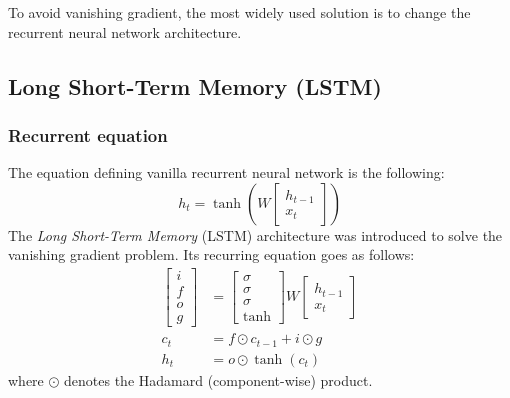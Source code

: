 To avoid vanishing gradient, the most widely used solution is to change the recurrent neural network architecture.

\subsection{Long Short-Term Memory (LSTM)}
\subsubsection{Recurrent equation}
The equation defining vanilla recurrent neural network is the following:
\begin{equation}
    h_t = \tanh\left(W\begin{bmatrix}
            h_{t-1}\\
            x_t
        \end{bmatrix}\right)
\end{equation}
The \emph{Long Short-Term Memory} (LSTM) architecture was introduced to solve the vanishing gradient problem. Its recurring equation goes as follows:
\begin{equation*}
    \tag{LSTM}
    \begin{aligned}
        \begin{bmatrix}
            i\\
            f\\
            o\\
            g
        \end{bmatrix}
        &= \begin{bmatrix}
            \sigma\\
            \sigma\\
            \sigma\\
            \tanh
        \end{bmatrix} W \begin{bmatrix}
            h_{t-1}\\
            x_t
        \end{bmatrix} \\
        c_t &= f \odot c_{t-1} + i\odot g\\
        h_t &= o \odot \tanh(c_t)
    \end{aligned}
\end{equation*}
where $\odot$ denotes the Hadamard (component-wise) product.

